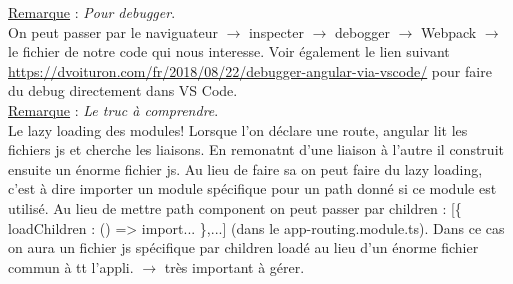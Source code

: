 \documentclass[a4paper,12pt,twoside]{article}
\newcommand{\rem}[2]{\noindent\underline{Remarque} : \textit{#1}.\\ \indent #2}
\begin{document}
\rem{Pour debugger}{ On peut passer par le naviguateur $\to$ inspecter $\to$ debogger $\to$ Webpack $\to$ le fichier de notre code qui nous interesse. Voir également le lien suivant \url{https://dvoituron.com/fr/2018/08/22/debugger-angular-via-vscode/} pour faire du debug directement dans VS Code.}\\

\rem{Le truc à comprendre}{Le lazy loading des modules! Lorsque l'on déclare une route, angular lit les fichiers js et cherche les liaisons. En remonatnt d'une liaison à l'autre il construit ensuite un énorme fichier js. Au lieu de faire sa on peut faire du lazy loading, c'est à dire importer un module spécifique pour un path donné si ce module est utilisé. Au lieu de mettre path component on peut passer par children : [\{ loadChildren : () => import... \},...] (dans le app-routing.module.ts). Dans ce cas on aura un fichier js spécifique par children loadé au lieu d'un énorme fichier commun à tt l'appli. $\to$ très important à gérer.}\\




\end{document}
